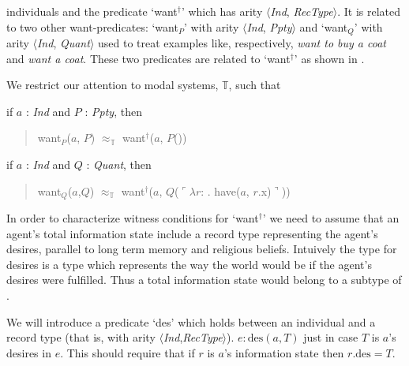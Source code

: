 individuals and the predicate `want$^\dagger$' which has arity
$\langle$\textit{Ind}, \textit{RecType}$\rangle$.  It is related to
two other want-predicates: `want$_P$' with arity
$\langle$\textit{Ind}, \textit{Ppty}$\rangle$ and `want$_Q$' with
arity $\langle$\textit{Ind}, \textit{Quant}$\rangle$ used to treat
examples like,
respectively, \textit{want to buy a coat} and \textit{want a coat}.
These two predicates are related to `want$^\dagger$' as shown in
\nexteg{}.
\begin{ex}
  We restrict our attention to modal systems, $\mathbb{T}$, such that
\begin{subex} 
 
\item if $a$ : \textit{Ind} and $P$ : \textit{Ppty}, then 
\begin{quote}
want$_P$($a$, $P$) $\approx_{\mathbb{T}}$ want$^\dagger$($a$, $P$())
\end{quote} 
 
\item if $a$ : \textit{Ind} and $Q$ : \textit{Quant}, then 
\begin{quote}
want$_Q$($a$,$Q$) $\approx_{\mathbb{T}}$
want$^\dagger$($a$, $Q$($\ulcorner\lambda
r$: . have($a$, $r$.x)$\urcorner$))
\end{quote} 
\end{subex} 
\label{ex:want-witcond} 
   
\end{ex}



In order to characterize witness conditions for `want$^{\dagger}$' we
need to assume that an agent's total information state include a
record type representing the agent's desires, parallel to long term
memory and religious beliefs.  Intuively the type for desires is a
type which represents the way the world would be if the agent's
desires were fulfilled.  Thus a total information state would belong
to a subtype of \nexteg{}.
\begin{ex} 
    \end{ex}
    
We will introduce a predicate `des' which holds between an
individual and a record type (that is, with arity
$\langle$\textit{Ind},\textit{RecType}$\rangle$).  $e:\text{des}(a,T)$
just in case $T$ is $a$'s desires in $e$.  This should require that if
$r$ is $a$'s information state then $r.\text{des}=T$.  %

